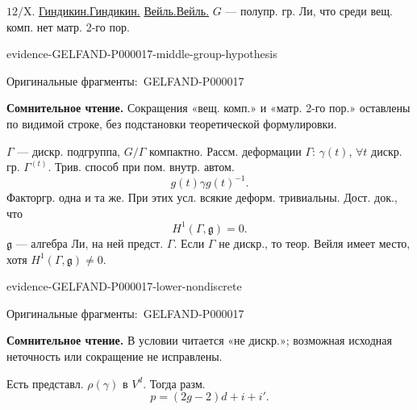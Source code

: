 \documentclass[11pt]{article}
\let\MathUnderline\underline
\renewcommand{\underline}[1]{\ifmmode\MathUnderline{#1}\else\uline{#1}\fi}
\newcommand{\EvidenceBlock}[4]{%
 \par\smallskip\noindent\begin{minipage}{\linewidth}
 \begin{minipage}[t]{.47\linewidth}\vspace{0pt}\centering
 \csname evidence-#1-#2\endcsname\par
 {\scriptsize\SourceCropCaption\ #1}\par
 \end{minipage}\hfill
 \begin{minipage}[t]{.49\linewidth}\vspace{0pt}\raggedright
 {\small\color{orange!65!black}\textbf{#4} #3}\par
 \end{minipage}
 \end{minipage}\par\smallskip}
\newcommand{\Unclear}[3]{\EvidenceBlock{#1}{#2}{#3}{\ReadingCaption}}
\newcommand{\SourceCropCaption}{Оригинальные фрагменты:}\newcommand{\ReadingCaption}{Сомнительное чтение.}\newcommand{\IncompleteCaption}{Неразобранный фрагмент.}\newcommand{\DiagramCaption}{Рисунок и набранное описание.}
\begin{document}
$12/\mathrm X$.
\underline{Гиндикин.}
\underline{Вейль.} $G$ --- полупр. гр. Ли, что среди вещ. комп. нет матр. 2-го пор.
\Unclear{GELFAND-P000017}{middle-group-hypothesis}{Сокращения «вещ. комп.» и «матр. 2-го пор.» оставлены по видимой строке, без подстановки теоретической формулировки.}
$\Gamma$ --- дискр. подгруппа, $G/\Gamma$ компактно.
Рассм. деформации $\Gamma$: $\gamma(t)$, $\forall t$ дискр. гр. $\Gamma^{(t)}$.
Трив. способ при пом. внутр. автом.
\begin{equation*}
g(t)\gamma g(t)^{-1}.
\end{equation*}
Факторгр. одна и та же.
При этих усл. всякие деформ. тривиальны.
Дост. док., что
\begin{equation*}
H^1(\Gamma,\mathfrak g)=0.
\end{equation*}
$\mathfrak g$ --- алгебра Ли, на ней предст. $\Gamma$.
Если $\Gamma$ не дискр., то теор. Вейля имеет место, хотя $H^1(\Gamma,\mathfrak g)\ne0$.
\Unclear{GELFAND-P000017}{lower-nondiscrete}{В условии читается «не дискр.»; возможная исходная неточность или сокращение не исправлены.}
Есть представл. $\rho(\gamma)$ в $V^d$. Тогда разм.
\begin{equation*}
p=(2g-2)d+i+i'.
\end{equation*}
\end{document}
